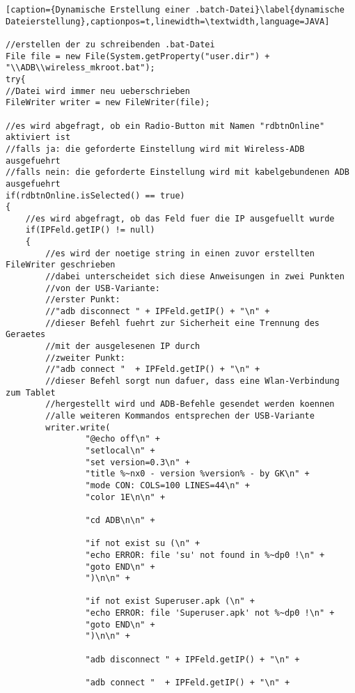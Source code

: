 \begin{flushleft}
\newpage
\begin{lstlisting}[caption={Dynamische Erstellung einer .batch-Datei}\label{dynamische Dateierstellung},captionpos=t,linewidth=\textwidth,language=JAVA] 
 
//erstellen der zu schreibenden .bat-Datei
File file = new File(System.getProperty("user.dir") + "\\ADB\\wireless_mkroot.bat");
try{
//Datei wird immer neu ueberschrieben
FileWriter writer = new FileWriter(file);	

//es wird abgefragt, ob ein Radio-Button mit Namen "rdbtnOnline" aktiviert ist
//falls ja: die geforderte Einstellung wird mit Wireless-ADB ausgefuehrt
//falls nein: die geforderte Einstellung wird mit kabelgebundenen ADB ausgefuehrt
if(rdbtnOnline.isSelected() == true)
{
	//es wird abgefragt, ob das Feld fuer die IP ausgefuellt wurde
	if(IPFeld.getIP() != null)
	{
		//es wird der noetige string in einen zuvor erstellten FileWriter geschrieben
		//dabei unterscheidet sich diese Anweisungen in zwei Punkten
		//von der USB-Variante:
		//erster Punkt:
		//"adb disconnect " + IPFeld.getIP() + "\n" +
		//dieser Befehl fuehrt zur Sicherheit eine Trennung des Geraetes 
		//mit der ausgelesenen IP durch
		//zweiter Punkt:
		//"adb connect "  + IPFeld.getIP() + "\n" +
		//dieser Befehl sorgt nun dafuer, dass eine Wlan-Verbindung zum Tablet
		//hergestellt wird und ADB-Befehle gesendet werden koennen 
		//alle weiteren Kommandos entsprechen der USB-Variante
		writer.write(
				"@echo off\n" +
				"setlocal\n" +
				"set version=0.3\n" +
				"title %~nx0 - version %version% - by GK\n" +
				"mode CON: COLS=100 LINES=44\n" +
				"color 1E\n\n" +
				
				"cd ADB\n\n" +
				
				"if not exist su (\n" +
				"echo ERROR: file 'su' not found in %~dp0 !\n" +
				"goto END\n" +
				")\n\n" +

				"if not exist Superuser.apk (\n" +
				"echo ERROR: file 'Superuser.apk' not %~dp0 !\n" +
				"goto END\n" +
				")\n\n" +
				  
				"adb disconnect " + IPFeld.getIP() + "\n" +
				
				"adb connect "  + IPFeld.getIP() + "\n" +
				

\end{lstlisting}
\end{flushleft}
